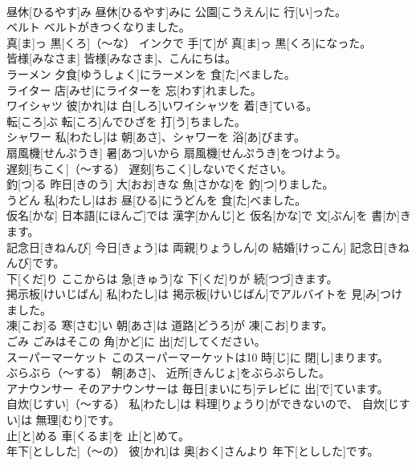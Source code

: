 \documentclass[8pt]{extreport}
\begin{document}
\begin{CJK}{UTF8}{min}
\\	昼休[ひるやす]み	昼休[ひるやす]みに 公園[こうえん]に 行[い]った。		
\\	ベルト	ベルトがきつくなりました。		
\\	真[ま]っ 黒[くろ]（～な）	インクで 手[て]が 真[ま]っ 黒[くろ]になった。		
\\	皆様[みなさま]	皆様[みなさま]、こんにちは。		
\\	ラーメン	夕食[ゆうしょく]にラーメンを 食[た]べました。		
\\	ライター	店[みせ]にライターを 忘[わす]れました。		
\\	ワイシャツ	彼[かれ]は 白[しろ]いワイシャツを 着[き]ている。		
\\	転[ころ]ぶ	転[ころ]んでひざを 打[う]ちました。		
\\	シャワー	私[わたし]は 朝[あさ]、シャワーを 浴[あ]びます。		
\\	扇風機[せんぷうき]	暑[あつ]いから 扇風機[せんぷうき]をつけよう。		
\\	遅刻[ちこく]（～する）	遅刻[ちこく]しないでください。		
\\	釣[つ]る	昨日[きのう] 大[おお]きな 魚[さかな]を 釣[つ]りました。		
\\	うどん	私[わたし]はお 昼[ひる]にうどんを 食[た]べました。		
\\	仮名[かな]	日本語[にほんご]では 漢字[かんじ]と 仮名[かな]で 文[ぶん]を 書[か]きます。		
\\	記念日[きねんび]	今日[きょう]は 両親[りょうしん]の 結婚[けっこん] 記念日[きねんび]です。		
\\	下[くだ]り	ここからは 急[きゅう]な 下[くだ]りが 続[つづ]きます。		
\\	掲示板[けいじばん]	私[わたし]は 掲示板[けいじばん]でアルバイトを 見[み]つけました。		
\\	凍[こお]る	寒[さむ]い 朝[あさ]は 道路[どうろ]が 凍[こお]ります。		
\\	ごみ	ごみはそこの 角[かど]に 出[だ]してください。		
\\	スーパーマーケット	このスーパーマーケットは10 時[じ]に 閉[し]まります。		
\\	ぶらぶら（～する）	朝[あさ]、 近所[きんじょ]をぶらぶらした。		
\\	アナウンサー	そのアナウンサーは 毎日[まいにち]テレビに 出[で]ています。		
\\	自炊[じすい]（～する）	私[わたし]は 料理[りょうり]ができないので、 自炊[じすい]は 無理[むり]です。		
\\	止[と]める	車[くるま]を 止[と]めて。		
\\	年下[としした]（～の）	彼[かれ]は 奥[おく]さんより 年下[としした]です。		

\end{CJK}
\end{document}

